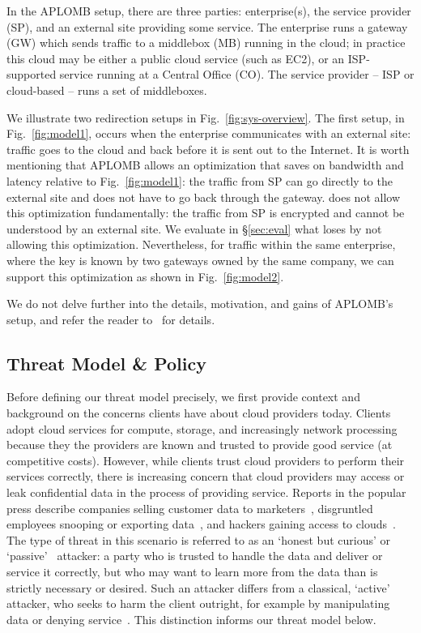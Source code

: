 In the APLOMB setup, there are three parties: enterprise(s), the service provider (SP), and an external site providing
some service. The enterprise runs a gateway (GW) which sends traffic to a middlebox (MB) running in the cloud; in practice this cloud may be either a public cloud service (such as EC2), or an ISP-supported service running at a Central Office (CO).
The service provider -- ISP or cloud-based -- runs a set of middleboxes. 

We illustrate two redirection setups in Fig.~\ref{fig:sys-overview}.  The first setup, in Fig.~\ref{fig:model1},  occurs when the enterprise communicates with an external site: traffic goes to the cloud and back before it is sent out to the Internet. 
It is worth mentioning that APLOMB allows an optimization that saves on bandwidth and latency relative to Fig.~\ref{fig:model1}: the traffic from SP can go directly to the external site and does not have to go back through the gateway. \sys does not allow this optimization fundamentally: the traffic from SP is encrypted and cannot be understood by an external site. We evaluate in \S\ref{sec:eval} what \sys loses by not allowing this optimization. 
Nevertheless, for traffic within the same enterprise, where the key is known by two gateways owned by the same company, we can support this optimization as shown in Fig.~\ref{fig:model2}.


We do not delve further into the details, motivation, and gains of APLOMB's setup, and refer the reader to~\cite{aplomb} for details. 


\subsection{Threat Model \& Policy}

Before defining our threat model precisely, we first provide context and background on the concerns clients have about cloud providers today.
  Clients adopt cloud services for compute, storage, and increasingly network processing because they the providers are known and trusted to provide good service (at competitive costs). 
  However, while clients trust cloud providers to perform their services correctly, there is increasing concern that cloud providers may access or leak confidential data in the process of providing service.
  Reports in the popular press describe companies selling customer data to marketers~\cite{example}, disgruntled employees snooping or exporting data~\cite{something}, and hackers gaining access to clouds~\cite{somethingelse}.
  The type of threat in this scenario is referred to as an `honest but curious' or `passive'~\cite{goodrich} attacker: a party who is trusted to handle the data and deliver or service it correctly, but who may want to learn more from the data than is strictly necessary or desired.
  Such an attacker differs from a classical, `active' attacker, who seeks to harm the client outright, for example by manipulating data or denying service~\cite{goodrich}.
  This distinction informs our threat model below. 

